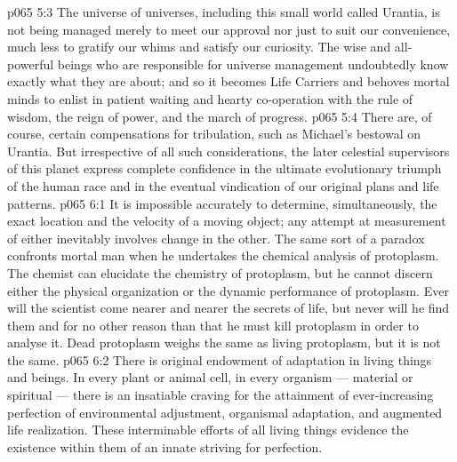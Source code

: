 \vs p065 5:3 The universe of universes, including this small world called Urantia, is not being managed merely to meet our approval nor just to suit our convenience, much less to gratify our whims and satisfy our curiosity. The wise and all\hyp{}powerful beings who are responsible for universe management undoubtedly know exactly what they are about; and so it becomes Life Carriers and behoves mortal minds to enlist in patient waiting and hearty co\hyp{}operation with the rule of wisdom, the reign of power, and the march of progress.
\vs p065 5:4 There are, of course, certain compensations for tribulation, such as Michael’s bestowal on Urantia. But irrespective of all such considerations, the later celestial supervisors of this planet express complete confidence in the ultimate evolutionary triumph of the human race and in the eventual vindication of our original plans and life patterns.
\vs p065 6:1 It is impossible accurately to determine, simultaneously, the exact location and the velocity of a moving object; any attempt at measurement of either inevitably involves change in the other. The same sort of a paradox confronts mortal man when he undertakes the chemical analysis of protoplasm. The chemist can elucidate the chemistry of  protoplasm, but he cannot discern either the physical organization or the dynamic performance of  protoplasm. Ever will the scientist come nearer and nearer the secrets of life, but never will he find them and for no other reason than that he must kill protoplasm in order to analyse it. Dead protoplasm weighs the same as living protoplasm, but it is not the same.
\vs p065 6:2 \pc There is original endowment of adaptation in living things and beings. In every  plant or animal cell, in every  organism --- material or spiritual --- there is an insatiable craving for the attainment of ever\hyp{}increasing perfection of environmental adjustment, organismal adaptation, and augmented life realization. These interminable efforts of all living things evidence the existence within them of an innate striving for perfection.
